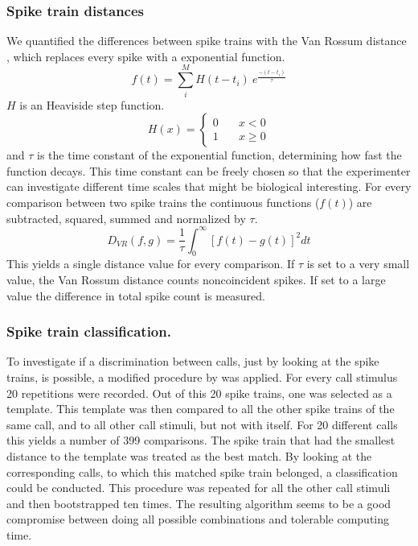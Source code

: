 \documentclass[12pt,a4paper]{article}
\begin{document}
\subsubsection{Spike train distances}
\label{spiketraindistances}
We quantified the  differences between spike trains with the Van Rossum distance \cite{rossum2001}, which replaces every spike with a exponential function.
\begin{equation}
\label{eq:VR}
f(t) =  \sum_{i}^{M} H(t-t_i)~e^{\frac{-(t-t_i)}{\tau}}
\end{equation}
$H$ is an Heaviside step function.
\begin{equation}
\label{eq:H}
H(x) = \left\{
\begin{array}{ll}
0 & \quad x < 0 \\
1 & \quad x \geq 0
\end{array}
\right.
\end{equation}
and $\tau$ is the time constant of the exponential function, determining how fast the function decays.
This time constant can be freely chosen so that the experimenter can investigate different time scales that might be biological interesting.
For every comparison between two spike trains the continuous functions ($f(t)$) are subtracted, squared, summed and normalized by $\tau$. 
\begin{equation}
\label{eq:VRD}
D_{VR}(f,g) = \frac{1}{\tau} \int_{0}^{\infty}[f(t)-g(t)]^2 dt
\end{equation}
This yields a single distance value for every comparison. If $\tau$ is set to a very small value, the Van Rossum distance counts noncoincident spikes. If set to a large value the difference in total spike count is measured.

\subsubsection{Spike train classification.}
To investigate if a discrimination between calls, just by looking at the spike trains, is possible, a modified procedure by \cite{machens2003} was applied. For every call stimulus 20 repetitions were recorded. Out of this 20 spike trains, one was selected as a template. This template was then compared to all the other spike trains of the same call, and to all other call stimuli, but not with itself. For 20 different calls this yields a number of 399 comparisons. The spike train that had the smallest distance to the template was treated as the best match. By looking at the corresponding calls, to which this matched spike train belonged, a classification could be conducted. This procedure was repeated for all the other call stimuli and then bootstrapped ten times. The resulting algorithm seems to be a good compromise between doing all possible combinations and tolerable computing time.
\end{document}
